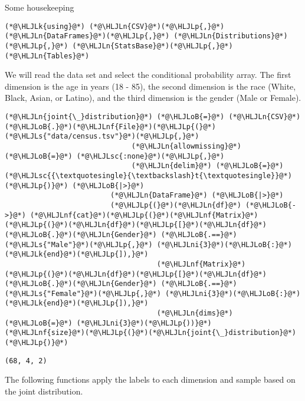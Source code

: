 \documentclass[12pt,a4paper]{article}
\newcommand{\HLJLk}[1]{\textcolor[RGB]{148,91,176}{\textbf{#1}}}
\newcommand{\HLJLn}[1]{#1}
\newcommand{\HLJLnf}[1]{\textcolor[RGB]{66,102,213}{#1}}
\newcommand{\HLJLs}[1]{\textcolor[RGB]{201,61,57}{#1}}
\newcommand{\HLJLsc}[1]{\textcolor[RGB]{201,61,57}{#1}}
\newcommand{\HLJLni}[1]{\textcolor[RGB]{59,151,46}{#1}}
\newcommand{\HLJLoB}[1]{\textcolor[RGB]{102,102,102}{\textbf{#1}}}
\newcommand{\HLJLp}[1]{#1}
\begin{document}
Some housekeeping


\begin{lstlisting}
(*@\HLJLk{using}@*) (*@\HLJLn{CSV}@*)(*@\HLJLp{,}@*) (*@\HLJLn{DataFrames}@*)(*@\HLJLp{,}@*) (*@\HLJLn{Distributions}@*)(*@\HLJLp{,}@*) (*@\HLJLn{StatsBase}@*)(*@\HLJLp{,}@*) (*@\HLJLn{Tables}@*)
\end{lstlisting}


We will read the data set and select the conditional probability array. The first dimension is the age in years (18 - 85), the second dimension is the race (White, Black, Asian, or Latino), and the third dimension is the gender (Male or Female).


\begin{lstlisting}
(*@\HLJLn{joint{\_}distribution}@*) (*@\HLJLoB{=}@*) (*@\HLJLn{CSV}@*)(*@\HLJLoB{.}@*)(*@\HLJLnf{File}@*)(*@\HLJLp{(}@*)(*@\HLJLs{"data/census.tsv"}@*)(*@\HLJLp{,}@*)
                              (*@\HLJLn{allowmissing}@*) (*@\HLJLoB{=}@*) (*@\HLJLsc{:none}@*)(*@\HLJLp{,}@*)
                              (*@\HLJLn{delim}@*) (*@\HLJLoB{=}@*) (*@\HLJLsc{{\textquotesingle}{\textbackslash}t{\textquotesingle}}@*)(*@\HLJLp{)}@*) (*@\HLJLoB{|>}@*)
                         (*@\HLJLn{DataFrame}@*) (*@\HLJLoB{|>}@*)
                         (*@\HLJLp{(}@*)(*@\HLJLn{df}@*) (*@\HLJLoB{->}@*) (*@\HLJLnf{cat}@*)(*@\HLJLp{(}@*)(*@\HLJLnf{Matrix}@*)(*@\HLJLp{(}@*)(*@\HLJLn{df}@*)(*@\HLJLp{[}@*)(*@\HLJLn{df}@*)(*@\HLJLoB{.}@*)(*@\HLJLn{Gender}@*) (*@\HLJLoB{.==}@*) (*@\HLJLs{"Male"}@*)(*@\HLJLp{,}@*) (*@\HLJLni{3}@*)(*@\HLJLoB{:}@*)(*@\HLJLk{end}@*)(*@\HLJLp{]),}@*)
                                    (*@\HLJLnf{Matrix}@*)(*@\HLJLp{(}@*)(*@\HLJLn{df}@*)(*@\HLJLp{[}@*)(*@\HLJLn{df}@*)(*@\HLJLoB{.}@*)(*@\HLJLn{Gender}@*) (*@\HLJLoB{.==}@*) (*@\HLJLs{"Female"}@*)(*@\HLJLp{,}@*) (*@\HLJLni{3}@*)(*@\HLJLoB{:}@*)(*@\HLJLk{end}@*)(*@\HLJLp{]),}@*)
                                    (*@\HLJLn{dims}@*) (*@\HLJLoB{=}@*) (*@\HLJLni{3}@*)(*@\HLJLp{))}@*)
(*@\HLJLnf{size}@*)(*@\HLJLp{(}@*)(*@\HLJLn{joint{\_}distribution}@*)(*@\HLJLp{)}@*)
\end{lstlisting}

\begin{lstlisting}
(68, 4, 2)
\end{lstlisting}


The following functions apply the labels to each dimension and sample based on the joint distribution.
\end{document}
